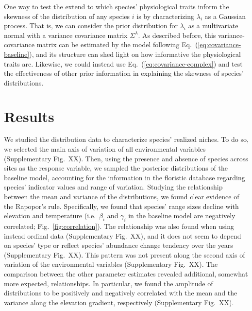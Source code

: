 \documentclass[11pt, a4paper]{article}
\begin{document}
One way to test the extend to which species' physiological traits inform the skewness of the distribution of any species $i$ is by characterizing $\lambda_{i}$ as a Gaussian process. That is, we can consider the prior distribution for $\lambda_{i}$ as a multivariate normal with a variance covariance matrix $\Sigma^{\lambda}$. As described before, this variance-covariance matrix can be estimated by the model following Eq.~(\ref{eq:covariance-baseline}), and its structure can shed light on how informative the physiological traits are. Likewise, we could instead use Eq.~(\ref{eq:covariance-complex}) and test the effectiveness of other prior information in explaining the skewness of species' distributions.


\section*{Results}
We studied the distribution data to characterize species' realized niches. To do so, we selected the main axis of variation of all environmental variables (Supplementary Fig.~XX). Then, using the presence and absence of species across sites as the response variable, we sampled the posterior distributions of the baseline model, accounting for the information in the floristic database regarding species' indicator values and range of variation. Studying the relationship between the mean and variance of the distributions, we found clear evidence of the Rapopor's rule. Specifically, we found that species' range sizes decline with elevation and temperature (i.e.~$\beta_{i}$ and $\gamma_{i}$ in the baseline model are negatively correlated; Fig.~\ref{fig:correlation}). The relationship was also found when using instead ordinal data (Supplementary Fig.~XX), and it does not seem to depend on species' type or reflect species' abundance change tendency over the years (Supplementary Fig.~XX). This pattern was not present along the second axis of variation of the environmental variables (Supplementary Fig.~XX). The comparison between the other parameter estimates revealed additional, somewhat more expected, relationships. In particular, we found the amplitude of distributions to be positively and negatively correlated with the mean and the variance along the elevation gradient, respectively (Supplementary Fig.~XX).
\end{document}
